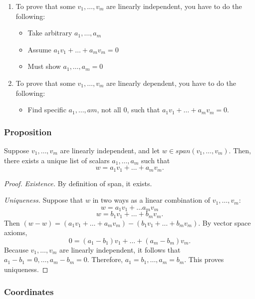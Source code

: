 \documentclass[11pt]{article}
\begin{document}
    \begin{enumerate}
        \item To prove that some \(v_1, \dots, v_m\) are linearly independent, you have to do the following:
        \begin{itemize}
            \item Take arbitrary \(a_1, \dots, a_m\)
            \item Assume \(a_1 v_1 + \dots + a_m v_m = 0\)
            \item Must show \(a_1, \dots, a_m = 0\)
        \end{itemize}

        \item To prove that some \(v_1, \dots, v_m\) are linearly dependent, you have to do the following:
        \begin{itemize}
            \item Find specific \(a_1, \dots, am\), not all 0, such that \(a_1 v_1 + \dots + a_m v_m = 0.\)
        \end{itemize}
    \end{enumerate}

    \subsubsection{Proposition}

    Suppose \(v_1, \dots, v_m\) are linearly independent, and let \(w \in span(v_1, \dots, v_m)\). Then, there exists a unique list of scalars \(a_1, \dots, a_m\) such that \[w = a_1 v_1 + \dots + a_m v_m.\]

    \begin{proof}
        \emph{Existence.} By definition of span, it exists.

        \emph{Uniqueness.} Suppose that $w$ in two ways as a linear combination of \(v_1, \dots, v_m\): \[w = a_1 v_1 + \dots a_m v_m\] \[w = b_1 v_1 + \dots + b_m v_m.\] Then \((w-w) = (a_1 v_1 + \dots + a_m v_m) - (b_1 v_1 + \dots + b_m v_m).\) By vector space axioms, \[0 = (a_1 - b_1) v_1 + \dots + (a_m - b_m) v_m.\] Because \(v_1, \dots, v_m\) are linearly independent, it follows that \(a_1 - b_1 = 0, \dots, a_m - b_m = 0.\) Therefore, \(a_1 = b_1, \dots, a_m = b_m.\) This proves uniqueness.
    \end{proof}

    \subsubsection{Coordinates}
\end{document}
